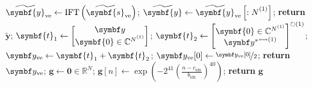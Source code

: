 \begin{algorithm}[h!]
\begin{algorithmic}[1]
            \State $\widetilde{\symbf{y}}_{\text{ve}} \gets \IFT \left( \widetilde{\symbf{s}}_{\text{ve}} \right)$;
            \State $\widetilde{\symbf{y}} \gets \widetilde{\symbf{y}}_{\text{ve}}\left[ : \None \right]$;
            \State \textbf{return} $\widetilde{\symbf{y}}$;
        \EndProcedure
        \Statex
            \State $\symbf{t}_1 \gets
            \begin{bmatrix}
                \by \\ \symbf{0} \in \mathbb{C}^{\None}
            \end{bmatrix}
            $;
            \State $\symbf{t}_2 \gets
            \begin{bmatrix}
            \symbf{0} \in \mathbb{C}^{\None} \\ {\by^*}^{\leftrightsquigarrow (1)}
            \end{bmatrix}^{\circlearrowright (1)}
            $;
            \State $\by_{\text{ve}} \gets \symbf{t}_1 + \symbf{t}_2$;
            \State $\by_{\text{ve}}[0] \gets \nicefrac{\by_{\text{ve}}[0]}{2}$;
            \State \textbf{return} $\by_{\text{ve}}$;
        \EndProcedure
        \Statex
            \State $\symbf{g} \gets \symbf{0} \in \mathbb{R}^{N}$;
                \State $\symbf{g}\left[ n \right] \gets \exp\left(
                    -2^{41} \left(
                        \frac{n - c_{\text{idx}}}{b_{\text{idx}}}
                    \right)^{40}
                    \right)
                $;
            \EndFor
            \State \textbf{return} $\symbf{g}$
        \EndProcedure
    \end{algorithmic}
\end{algorithm}


